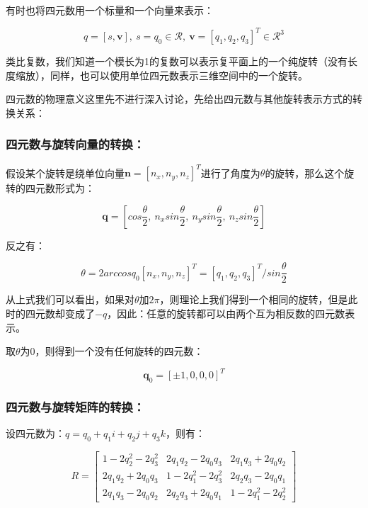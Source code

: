 \documentclass[10pt, oneside]{book}
\begin{document}
有时也将四元数用一个标量和一个向量来表示：

\begin{equation}
    q = [s,\textbf{v}],\ s = q_0 \in \mathcal{R}, \ \textbf{v} = [q_1,q_2,q_3]^T \in \mathcal{R}^3
\end{equation}

类比复数，我们知道一个模长为1的复数可以表示复平面上的一个纯旋转（没有长度缩放），同样，也可以使用单位四元数表示三维空间中的一个旋转。

四元数的物理意义这里先不进行深入讨论，先给出四元数与其他旋转表示方式的转换关系：

\subsubsection{四元数与旋转向量的转换：}

假设某个旋转是绕单位向量$\textbf{n} = [n_x,n_y,n_z]^T$进行了角度为$\theta$的旋转，那么这个旋转的四元数形式为：

\begin{equation}
    \textbf{q} = [cos\frac{\theta}{2},\ n_xsin\frac{\theta}{2},\ n_ysin\frac{\theta}{2},\ n_zsin\frac{\theta}{2}]
\end{equation}

反之有：

\begin{equation}
    \theta = 2arccosq_0
    [n_x,n_y,n_z]^T = [q_1,q_2,q_3]^T/sin\frac{\theta}{2}
\end{equation}

从上式我们可以看出，如果对$\theta$加$2\pi$，则理论上我们得到一个相同的旋转，但是此时的四元数却变成了$-q$，因此：任意的旋转都可以由两个互为相反数的四元数表示。

取$\theta$为0，则得到一个没有任何旋转的四元数：

\begin{equation}
    \textbf{q}_0 = [\pm 1,0,0,0]^T
\end{equation}

\subsubsection{四元数与旋转矩阵的转换：}

设四元数为：$q = q_0 + q_1i + q_2j + q_3k$，则有：

\begin{equation}
    R = 
    \begin{bmatrix}
     1-2q_2^2-2q_3^2   & 2q_1q_2-2q_0q_3  & 2q_1q_3+2q_0q_2 \\
     2q_1q_2+2q_0q_3 & 1-2q_1^2-2q_3^2   & 2q_2q_3-2q_0q_1\\
     2q_1q_3-2q_0q_2  & 2q_2q_3+2q_0q_1 & 1-2q_1^2-2q_2^2
    \end{bmatrix}
\end{equation}
\end{document}
